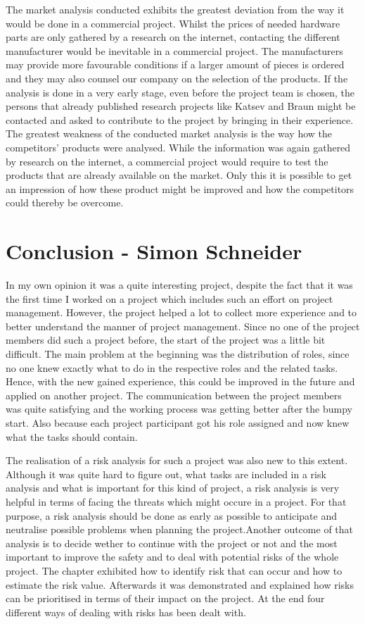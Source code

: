 The market analysis conducted exhibits the greatest deviation from the way it
would be done in a commercial project. Whilst the prices of needed hardware
parts are only gathered by a research on the internet, contacting the different
manufacturer would be inevitable in a commercial project. The manufacturers may
provide more favourable conditions if a larger amount of pieces is ordered and
they may also counsel our company on the selection of the products. If the
analysis is done in a very early stage, even before the project team is chosen,
the persons that already published research projects like Katsev and Braun might
be contacted and asked to contribute to the project by bringing in their
experience. The greatest weakness of the conducted market analysis is the way
how the competitors' products were analysed. While the information was again
gathered by research on the internet, a commercial project would require to test
the products that are already available on the market. Only this it is possible
to get an impression of how these product might be improved and how the
competitors could thereby be overcome.

\section{Conclusion - Simon Schneider}

In my own opinion it was a quite interesting project, despite the fact that it
was the first time I worked on a project which includes such an effort on
project management. However, the project helped a lot to collect more experience
and to better understand the manner of project management. Since no one of the
project members did such a project before, the start of the project was a
little bit difficult. The main problem at the beginning was the distribution of
roles, since no one knew exactly what to do in the respective roles and the
related tasks. Hence, with the new gained experience, this could be improved in
the future and applied on another project. The communication between the project
members was quite satisfying and the working process was getting better after
the bumpy start. Also because each project participant got his role assigned and
now knew what the tasks should contain.

The realisation of a risk analysis for such a project was also new to this 
extent. Although it was quite hard to figure out, what tasks are included in a
risk analysis and what is important for this kind of project, a risk analysis is
very helpful in terms of facing the threats which might occure in a project.
For that purpose, a risk analysis should be done as early as possible to 
anticipate and neutralise possible problems when planning the project.Another
outcome of that analysis is to decide wether to continue with the project or not
and the most important to improve the safety and to deal with potential risks of
the whole project. The chapter exhibited how to identify risk that can occur and
how to estimate the risk value. Afterwards it was demonstrated and explained how
risks can be prioritised in terms of their impact on the project. At the end
four different ways of dealing with risks has been dealt with.

